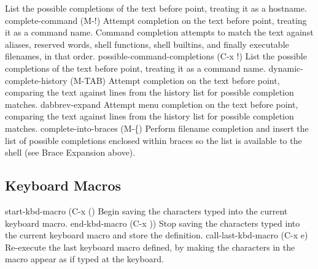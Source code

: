 List the possible completions of the text before point, treating it as a hostname.
complete-command (M-!)
Attempt completion on the text before point, treating it as a command name. Command completion attempts to match the text against aliases, reserved words, shell functions, shell builtins, and finally executable filenames, in that order.
possible-command-completions (C-x !)
List the possible completions of the text before point, treating it as a command name.
dynamic-complete-history (M-TAB)
Attempt completion on the text before point, comparing the text against lines from the history list for possible completion matches.
dabbrev-expand
Attempt menu completion on the text before point, comparing the text against lines from the history list for possible completion matches.
complete-into-braces (M-\{)
Perform filename completion and insert the list of possible completions enclosed within braces so the list is available to the shell (see Brace Expansion above).

\subsection{Keyboard Macros}\label{sec:keyboardmacros}

start-kbd-macro (C-x ()
Begin saving the characters typed into the current keyboard macro.
end-kbd-macro (C-x ))
Stop saving the characters typed into the current keyboard macro and store the definition.
call-last-kbd-macro (C-x e)
Re-execute the last keyboard macro defined, by making the characters in the macro appear as if typed at the keyboard.

